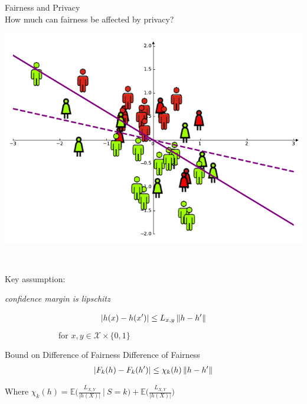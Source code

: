 \documentclass[aspectratio=169,14pt]{beamer}
\begin{document}
\begin{frame}{Fairness and Privacy \\
    \large How much can fairness be affected by privacy?}
  \begin{minipage}{0.5\linewidth}
    \includegraphics[width=\textwidth]{images/dataset-model2-fairness.png}
  \end{minipage}%
  ~~~~~~
  \begin{minipage}{0.5\linewidth}
    Key assumption:
    \begin{center}
      \textit{confidence margin is lipschitz}
    \end{center}

    \vspace{-1.5em}
    
    \begin{align*}
      | h(x) - h(x') | \le L_{x,y} \left\| h - h' \right\|
    \end{align*}
    ~~~~~~~~~~~~~for $x, y \in \mathcal{X} \times \{0, 1\}$
  \end{minipage}%
\end{frame}



\begin{frame}{Bound on Difference of Fairness}
  Difference of Fairness
  \begin{align*}
    | F_k(h) - F_k(h') |
    \le
    \chi_k (h) \left\| h - h' \right\|
  \end{align*}

  Where $\chi_k(h) = \mathbb{E}\Big( \frac{L_{X,Y}}{| h(X) |} ~\Big|~ S = k \Big)
  + \mathbb{E}\Big( \frac{L_{X,Y}}{| h(X) |} \Big)$
\end{frame}
\end{document}
